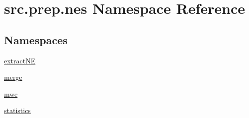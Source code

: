 \hypertarget{namespacesrc_1_1prep_1_1nes}{}\section{src.\+prep.\+nes Namespace Reference}
\label{namespacesrc_1_1prep_1_1nes}
\subsection*{Namespaces}
\begin{DoxyCompactItemize}
\item 
 \hyperlink{namespacesrc_1_1prep_1_1nes_1_1extract_n_e}{extract\+NE}
\item 
 \hyperlink{namespacesrc_1_1prep_1_1nes_1_1merge}{merge}
\item 
 \hyperlink{namespacesrc_1_1prep_1_1nes_1_1mwe}{mwe}
\item 
 \hyperlink{namespacesrc_1_1prep_1_1nes_1_1statistics}{statistics}
\end{DoxyCompactItemize}
